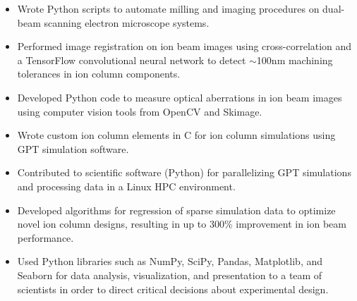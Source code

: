 \documentclass[letterpaper,10.8pt]{article}
\begin{document}
    \begin{itemize}[label={$\diamond$}]
    \itemsep0em %
    	\item {Wrote Python scripts to automate milling and imaging procedures on dual-beam scanning electron microscope systems.}
	
	\item {Performed image registration on ion beam images using cross-correlation and a TensorFlow convolutional neural network to detect $\sim$100nm machining tolerances in ion column components.}
	
	\item {Developed Python code to measure optical aberrations in ion beam images using computer vision tools from OpenCV and Skimage.}
	
	\item {Wrote custom ion column elements in C for ion column simulations using GPT simulation software.}
	
	\item {Contributed to scientific software (Python) for parallelizing GPT simulations and processing data in a Linux HPC environment.}
	
	\item {Developed algorithms for regression of sparse simulation data to optimize novel ion column designs, resulting in up to 300\% improvement in ion beam performance.}
	
	\item {Used Python libraries such as NumPy, SciPy, Pandas, Matplotlib, and Seaborn for data analysis, visualization, and presentation to a team of scientists in order to direct critical decisions about experimental design.}
	
	\end{itemize} %
      
\end{document}
